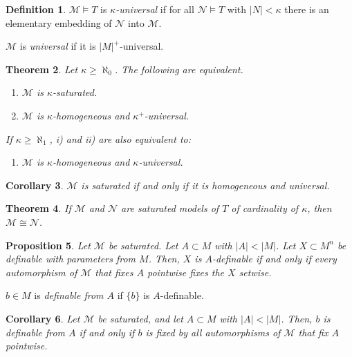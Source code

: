 \documentclass{amsart}
\newtheorem{theorem}{Theorem}[subsection]
\newtheorem{proposition}[theorem]{Proposition}
\newtheorem{corollary}[theorem]{Corollary}
\theoremstyle{definition}
\newtheorem{definition}[theorem]{Definition}
\numberwithin{equation}{section}
\begin{document}
\begin{definition}
	$\mathcal{M} \models T$ is \emph{$\kappa$-universal} if for all $\mathcal{N}\models T$ with $|N| < \kappa$ there is an elementary embedding of $\mathcal{N}$ into $\mathcal{M}$.

	$\mathcal{M}$ is \emph{universal} if it is $|M|^+$-universal.
\end{definition}

\begin{theorem}
	Let $\kappa \ge \aleph_0$.
	The following are equivalent.
	\begin{enumerate}[label = {\roman*)}]
		\item $\mathcal{M}$ is $\kappa$-saturated.
		\item $\mathcal{M}$ is $\kappa$-homogeneous and $\kappa^+$-universal.
	\end{enumerate}
	If $\kappa \ge \aleph_1$, i) and ii) are also equivalent to:
	\begin{enumerate}[resume, label = {\roman*)}]
		\item $\mathcal{M}$ is $\kappa$-homogeneous and $\kappa$-universal.
	\end{enumerate}
\end{theorem}

\begin{corollary}
	$\mathcal{M}$ is saturated if and only if it is homogeneous and universal.
\end{corollary}

\begin{theorem}
	If $\mathcal{M}$ and $\mathcal{N}$ are saturated models of $T$ of cardinality of $\kappa$,
	then $\mathcal{M}\cong\mathcal{N}$.
\end{theorem}

\begin{proposition}
	Let $\mathcal{M}$ be saturated.
	Let $A \subset M$ with $|A| < |M|$.
	Let $X \subset M^n$ be definable with parameters from $M$.
	Then, $X$ is $A$-definable if and only if every automorphism of $\mathcal{M}$ that fixes $A$ pointwise fixes the $X$ setwise.
\end{proposition}

$b \in M$ is \emph{definable from $A$} if $\{b\}$ is $A$-definable.
\begin{corollary}
	Let $\mathcal{M}$ be saturated,
	and let $A \subset M$ with $|A| < |M|$.
	Then, $b$ is definable from $A$ if and only if $b$ is fixed by all automorphisms of $\mathcal{M}$ that fix $A$ pointwise.
\end{corollary}
\end{document}
